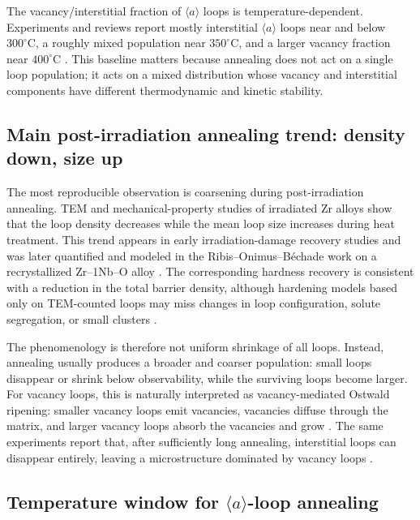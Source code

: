 \documentclass[11pt]{article}
\newcommand{\degreeC}{^\circ\mathrm{C}}
\begin{document}
The vacancy/interstitial fraction of $\langle a\rangle$ loops is temperature-dependent.  Experiments and reviews report mostly interstitial $\langle a\rangle$ loops near and below $300\degreeC$, a roughly mixed population near $350\degreeC$, and a larger vacancy fraction near $400\degreeC$ \citep{Jostsons1977,Northwood1979,Gilbert1979,Griffiths1988,Adamson2019,Liu2020}.  This baseline matters because annealing does not act on a single loop population; it acts on a mixed distribution whose vacancy and interstitial components have different thermodynamic and kinetic stability.

\subsection{Main post-irradiation annealing trend: density down, size up}

The most reproducible observation is coarsening during post-irradiation annealing.  TEM and mechanical-property studies of irradiated Zr alloys show that the loop density decreases while the mean loop size increases during heat treatment.  This trend appears in early irradiation-damage recovery studies and was later quantified and modeled in the Ribis--Onimus--B{\'e}chade work on a recrystallized Zr--1Nb--O alloy \citep{HoweThomas1974,Ribis2008,Ribis2010}.  The corresponding hardness recovery is consistent with a reduction in the total barrier density, although hardening models based only on TEM-counted loops may miss changes in loop configuration, solute segregation, or small clusters \citep{Francis2015}.

The phenomenology is therefore not uniform shrinkage of all loops.  Instead, annealing usually produces a broader and coarser population: small loops disappear or shrink below observability, while the surviving loops become larger.  For vacancy loops, this is naturally interpreted as vacancy-mediated Ostwald ripening: smaller vacancy loops emit vacancies, vacancies diffuse through the matrix, and larger vacancy loops absorb the vacancies and grow \citep{Ribis2008,Ribis2010}.  The same experiments report that, after sufficiently long annealing, interstitial loops can disappear entirely, leaving a microstructure dominated by vacancy loops \citep{Ribis2008,Ribis2010}.

\subsection{Temperature window for $\langle a\rangle$-loop annealing}
\end{document}
